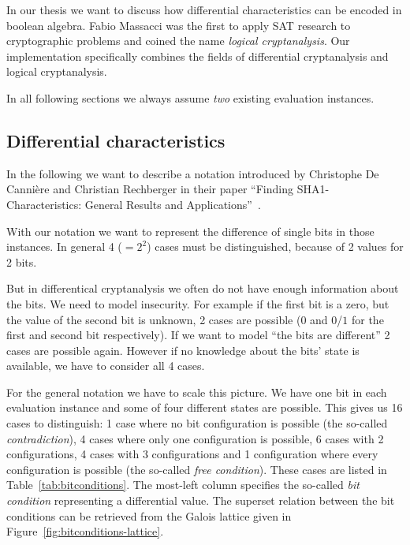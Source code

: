 In our thesis we want to discuss how differential characteristics can be encoded in boolean algebra. Fabio Massacci was the first to apply SAT research to cryptographic problems and coined the name \emph{logical cryptanalysis}. Our implementation specifically combines the fields of differential cryptanalysis and logical cryptanalysis.

In all following sections we always assume \emph{two} existing evaluation instances.

\subsection{Differential characteristics}
\label{sec:differential-characteristic}
%
In the following we want to describe a notation introduced by Christophe De Cannière and Christian Rechberger in their paper ``Finding SHA1-Characteristics: General Results and Applications''~\cite{Cry01}.

With our notation we want to represent the difference of single bits in those instances. In general 4 ($= 2^2$) cases must be distinguished, because of 2 values for 2 bits.

But in differentical cryptanalysis we often do not have enough information about the bits. We need to model insecurity. For example if the first bit is a zero, but the value of the second bit is unknown, 2 cases are possible ($0$ and $0$/$1$ for the first and second bit respectively). If we want to model ``the bits are different'' 2 cases are possible again. However if no knowledge about the bits' state is available, we have to consider all 4 cases.

For the general notation we have to scale this picture. We have one bit in each evaluation instance and some of four different states are possible. This gives us 16 cases to distinguish: 1 case where no bit configuration is possible (the so-called \emph{contradiction}), 4 cases where only one configuration is possible, 6 cases with 2 configurations, 4 cases with 3 configurations and 1 configuration where every configuration is possible (the so-called \emph{free condition}). These cases are listed in Table~\ref{tab:bitconditions}. The most-left column specifies the so-called \emph{bit condition} representing a differential value. The superset relation between the bit conditions can be retrieved from the Galois lattice given in Figure~\ref{fig:bitconditions-lattice}.

